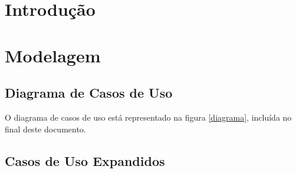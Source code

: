 \documentclass[a4paper,11pt]{article}
\begin{document}
\tableofcontents
\listoffigures
\newpage

\section{Introdução}
	
\section{Modelagem}

\subsection{Diagrama de Casos de Uso}

O diagrama de casos de uso está representado na figura \ref{diagrama}, incluída no final deste documento.

\subsection{Casos de Uso Expandidos}
\end{document}
